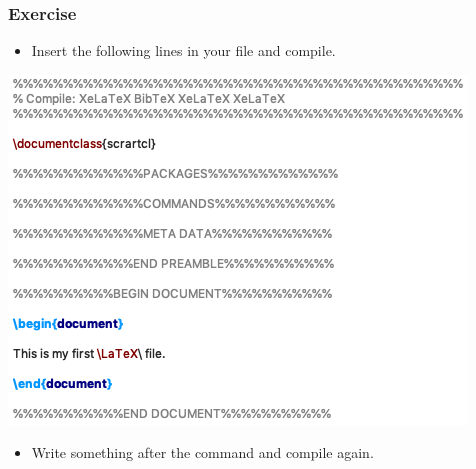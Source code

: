 \begin{frame}[fragile]
\frametitle{Exercise}

\begin{itemize}
	\item Insert the following lines in your  file and compile.
\end{itemize}


\vspace{.25cm}


\centering
\includegraphics[scale=0.45]{../../texfiles-beamer/tex-material/WissArb-latex/xelatexTest1tex}

%
%



\begin{itemize}
	\item Write something after the \lstinline|| command and compile again.	
\end{itemize}

\end{frame}


%
%
%
%
%
%
%


